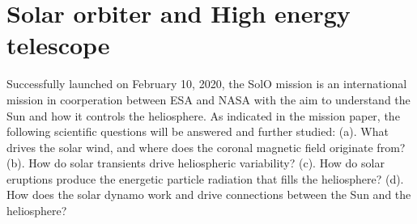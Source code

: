 \section {Solar orbiter and High energy telescope}
\label{sec:Solar_Orbiter}
Successfully launched on February 10, 2020, the \ac{SolO} mission \citep{Mueller-2020-SolO} is an international mission in coorperation between \ac{ESA} and \ac{NASA} with the aim to understand the Sun and how it controls the heliosphere. As indicated in the mission paper, the following scientific questions will be answered and further studied: (a). What drives the solar wind, and where does the coronal magnetic field originate from? (b). How do solar transients drive heliospheric variability? (c). How do solar eruptions produce the energetic particle radiation that fills the heliosphere? (d). How does the solar dynamo work and drive connections between the Sun and the heliosphere?


